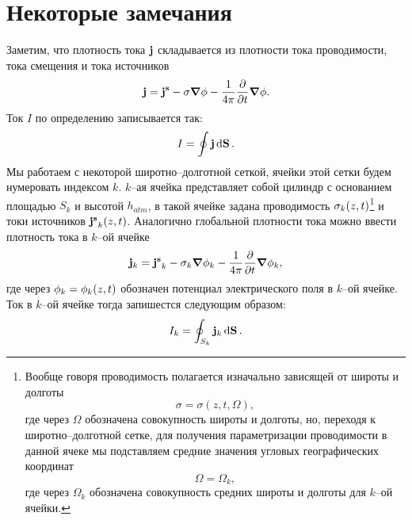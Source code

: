 \documentclass[12pt]{article}
\begin{document}
	\section{Некоторые замечания}
	\par Заметим, что плотность тока $\vb{j}$ складывается из плотности тока проводимости, тока смещения и тока источников
	\begin{equation}
		\vb{j} = \vb{j^s} - \sigma\grad\phi - \dfrac1{4\pi}\pdv{t} \grad \phi.
	\end{equation}
	Ток $I$ по определению записывается так:
	\begin{equation}
		I = \oint \vb{j} \dd{\vb{S}}.
	\end{equation}
	Мы работаем с некоторой широтно\---долготной сеткой, ячейки этой сетки будем нумеровать индексом $k$. $k$\---ая ячейка представляет собой цилиндр с основанием площадью $S_k$ и высотой $h_{atm}$, в такой ячейке задана проводимость $\sigma_k\qty(z,t)$\footnote{
		Вообще говоря проводимость полагается изначально зависящей от широты и долготы $$\sigma = \sigma(z,t,\Omega),$$ где через $\Omega$ обозначена совокупность широты и долготы, но, переходя к широтно\---долготной сетке, для получения параметризации проводимости в данной ячеке мы подставляем средние значения угловых географических координат $$\Omega = \Omega_k,$$ где через $\Omega_k$ обозначена совокупность средних широты и долготы для $k$\---ой ячейки. 
	} и токи источников $\vb{j^s}_k\qty(z,t)$. Аналогично глобальной плотности тока можно ввести плотность тока в $k$\---ой ячейке
	\begin{equation}
		\vb{j}_k = \vb{j^s}_k - \sigma_k\grad\phi_k - \dfrac1{4\pi}\pdv{t} \grad \phi_k,
	\end{equation}
	где через $\phi_k = \phi_k\qty(z,t)$ обозначен потенциал электрического поля в $k$\---ой ячейке. Ток в $k$\---ой ячейке тогда запишестся следующим образом:
	\begin{equation}
		I_k = \oint_{S_k} \vb{j}_k \dd{\vb{S}}. %
	\end{equation}
\end{document}
